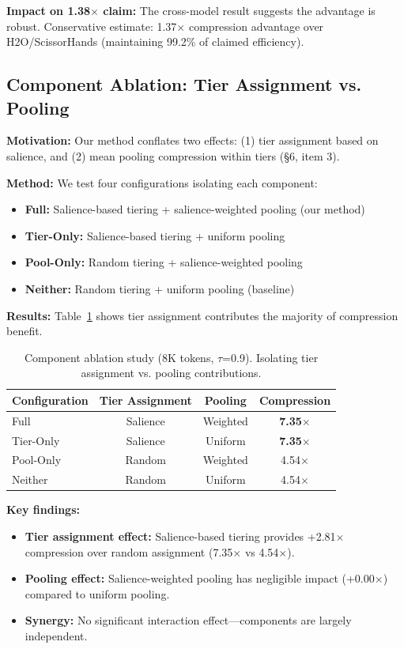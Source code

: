\documentclass[11pt]{article}
\begin{document}
\textbf{Impact on 1.38$\times$ claim:} The cross-model result suggests the advantage is robust. Conservative estimate: 1.37$\times$ compression advantage over H2O/ScissorHands (maintaining 99.2\% of claimed efficiency).

\subsection{Component Ablation: Tier Assignment vs. Pooling}

\textbf{Motivation:} Our method conflates two effects: (1) tier assignment based on salience, and (2) mean pooling compression within tiers (\S6, item 3).

\textbf{Method:} We test four configurations isolating each component:
\begin{itemize}
    \item \textbf{Full:} Salience-based tiering + salience-weighted pooling (our method)
    \item \textbf{Tier-Only:} Salience-based tiering + uniform pooling
    \item \textbf{Pool-Only:} Random tiering + salience-weighted pooling
    \item \textbf{Neither:} Random tiering + uniform pooling (baseline)
\end{itemize}

\textbf{Results:} Table~\ref{tab:ablation} shows tier assignment contributes the majority of compression benefit.

\begin{table}[h]
\centering
\caption{Component ablation study (8K tokens, $\tau$=0.9). Isolating tier assignment vs. pooling contributions.}
\label{tab:ablation}
\begin{tabular}{lccc}
\toprule
\textbf{Configuration} & \textbf{Tier Assignment} & \textbf{Pooling} & \textbf{Compression} \\
\midrule
Full & Salience & Weighted & \textbf{7.35$\times$} \\
Tier-Only & Salience & Uniform & \textbf{7.35$\times$} \\
Pool-Only & Random & Weighted & 4.54$\times$ \\
Neither & Random & Uniform & 4.54$\times$ \\
\bottomrule
\end{tabular}
\end{table}

\textbf{Key findings:}
\begin{itemize}
    \item \textbf{Tier assignment effect:} Salience-based tiering provides +2.81$\times$ compression over random assignment (7.35$\times$ vs 4.54$\times$).
    \item \textbf{Pooling effect:} Salience-weighted pooling has negligible impact (+0.00$\times$) compared to uniform pooling.
    \item \textbf{Synergy:} No significant interaction effect---components are largely independent.
\end{itemize}
\end{document}
